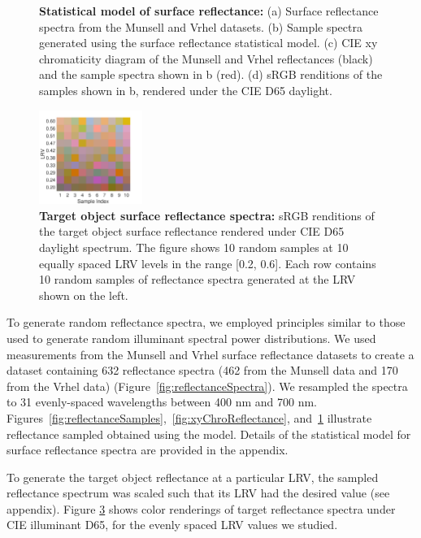 \documentclass{jov}
\begin{document}
\begin{figure}
\begin{subfigure}{0.24 \textwidth}
        \label{fig:backgroundSwatches}
    \end{subfigure}
    \caption{{\bf Statistical model of surface reflectance:} (a) Surface reflectance spectra from the Munsell and Vrhel datasets. (b) Sample spectra generated using the surface reflectance statistical model. (c) CIE xy chromaticity diagram of the Munsell and Vrhel reflectances (black) and the sample spectra shown in b (red). (d) sRGB renditions of the samples shown in b, rendered under the CIE D65 daylight.}
\label{fig:surfaceReflectanceGeneration}
\end{figure}

\begin{figure}
\centering
\includegraphics[width=0.3\textwidth]{../FiguresDraft5/Figure8/Figure8.pdf}
\caption{{\bf Target object surface reflectance spectra:} sRGB renditions of the target object surface reflectance rendered under CIE D65 daylight spectrum. The figure shows 10 random samples at 10 equally spaced LRV levels in the range [0.2, 0.6]. Each row contains 10 random samples of reflectance spectra generated at the LRV shown on the left.}
\label{fig:targetSwatches}
\end{figure}

To generate random reflectance spectra, we employed principles similar to those used to generate random illuminant spectral power distributions.
We used measurements from the Munsell \cite{kelly1943tristimulus} and Vrhel \cite{vrhel1994measurement} surface reflectance datasets to create a dataset containing 632 reflectance spectra (462 from the Munsell data and 170 from the Vrhel data) (Figure~\ref{fig:reflectanceSpectra}).
We resampled the spectra to 31 evenly-spaced wavelengths between 400 nm and 700 nm.
Figures~\ref{fig:reflectanceSamples},~\ref{fig:xyChroReflectance}, and~\ref{fig:backgroundSwatches} illustrate reflectance sampled obtained using the model. 
Details of the statistical model for surface reflectance spectra are provided in the appendix. 

To generate the target object reflectance at a particular LRV, the sampled reflectance spectrum was 
scaled such that its LRV had the desired value (see appendix).
Figure \ref{fig:targetSwatches} shows color renderings of target reflectance spectra under CIE illuminant D65, for the evenly spaced LRV values we studied.
\end{document}
